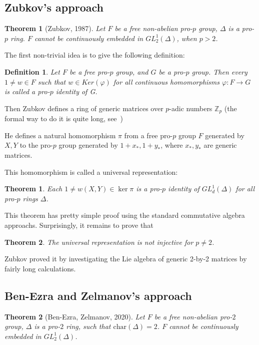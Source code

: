 \documentclass[12pt,a4paper]{article}
\newtheorem{theorem}{Theorem}[subsection]
\newtheorem*{theorem*}{Theorem}
\newtheorem{definition}{Definition}[subsection]
\begin{document}
    \subsection{Zubkov's approach}

    \begin{theorem*}[Zubkov, 1987]
        Let $F$ be a free non-abelian pro-$p$ group, $\Delta$ is a pro-$p$ ring.
        $F$ cannot be continuously embedded in $GL^1_2(\Delta)$, when $p>2$.
    \end{theorem*}
    \vskip 0.1in\noindent

    The first non-trivial idea is to give the following definition:
    \vskip 0.1in\noindent
    \begin{definition}
        Let $F$ be a free pro-$p$ group, and $G$ be a pro-$p$ group.
        Then every $1\neq w\in F$ such that $w\in Ker(\varphi)$ for all continuous homomorphisms $\varphi: F\to G$ is called a pro-$p$ identity of G.
    \end{definition}
    \vskip 0.1in\noindent
    Then Zubkov defines a ring of generic matrices over $p$-adic numbers $\mathbb{Z}_p$ (the formal way to do it is quite long, see~\cite{Zubkov})

    He defines a natural homomorphism $\pi$ from a free pro-$p$ group $F$ generated by $X, Y$ to the pro-$p$ group generated by
    $1 + x_*, 1 + y_*$, where $x_*, y_*$ are generic matrices.

    This homomorphism is called a universal representation:
    \vskip 0.1in\noindent
    \begin{theorem}
        Each $1\neq w(X, Y) \in \ker \pi$ is a pro-$p$ identity of $GL^1_d(\Delta)$ for all pro-$p$ rings $\Delta$.
    \end{theorem}
    \vskip 0.1in\noindent
    This theorem has pretty simple proof using the standard commutative algebra approachs.
    Surprisingly, it remains to prove that
    \vskip 0.1in\noindent
    \begin{theorem}
        The universal representation is not injective for $p\neq 2$.
    \end{theorem}
    \vskip 0.1in\noindent
    Zubkov proved it by investigating the Lie algebra of generic 2-by-2 matrices by fairly long calculations.

    \subsection{Ben-Ezra and Zelmanov's approach}
    \begin{theorem*}[Ben-Ezra, Zelmanov, 2020]
        Let $F$ be a free non-abelian pro-$2$ group, $\Delta$ is a pro-$2$ ring, such that $\mathrm{char}(\Delta)=2$.
        $F$ cannot be continuously embedded in $GL^1_2(\Delta)$.
    \end{theorem*}
    \vskip 0.1in\noindent
\end{document}
